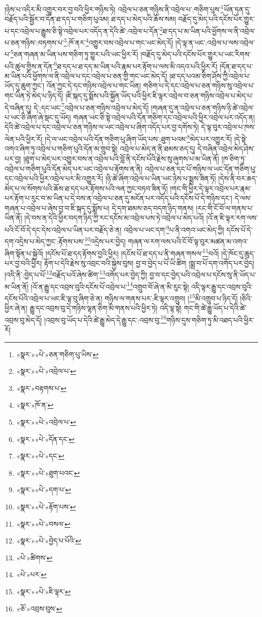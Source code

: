 །ཉེས་པ་འདིར་མི་འགྱུར་བར་བྱ་བའི་ཕྱིར་གཉིས་ཏེ། འབྲེལ་པ་ཅན་གཉིས་ནི་འབྲེལ་པ་:གཅིག་པུས་\footnote{«སྣར་»«པེ་»ཅན་གཅིག་པུ་ཡིས་}ཡོན་ཏན་དུ་བརྗོད་པའི་སྦྱོར་བ་དོན་ཐ་དད་པ་གཅིག་པུའམ། ཐ་དད་པ་མེད་པའི་ཆོས་སམ། བརྗོད་དུ་མེད་པའི་དངོས་པོར་གྱུར་པ་དང་འབྲེལ་པ་རྒྱུས་ཅི་སྟེ་འབྲེལ་པར་འདོད་ན་དེའི་ཚེ་:འབྲེལ་པ་དོན་\footnote{«སྣར་»«པེ་»འབྲེལ་པ་}ཐ་དད་པ་མ་ཡིན་པའི་ཕྱོགས་ལ་ནི་འབྲེལ་པ་ཅན་གཉིས་:བཏགས་པ་\footnote{«སྣར་»བརྟགས་པ་}:ཁོ་ནར་\footnote{«སྣར་»ཁོ་ན་}འགྱུར་བས་འབྲེལ་པ་གང་ཡང་མེད་དོ། །དེ་ལྟ་ན་ཡང་:འབྲེལ་པ་ལས་འབྲེལ་པ་\footnote{«སྣར་»«པེ་»འབྲེལ་པ་}ཅན་གཞན་མ་ཡིན་པས་གཅིག་ཏུ་གྱུར་པའི་ཡང་ཕྱིར་རོ། །བརྗོད་དུ་མེད་པའི་དངོས་པོར་གྱུར་པ་ཡང་རིགས་པའི་ཚུལ་གྱིས་ན་དོན་\footnote{«སྣར་»«པེ་»དོན་དང་}ཐ་དད་པ་ཐ་དད་མ་ཡིན་པའི་རྣམ་པར་རྟོག་པ་ལས་མི་འདའ་པའི་ཕྱིར་རོ། །དོན་ཐ་དད་པ་མ་ཡིན་པའི་ཕྱོགས་ལ་ནི་འབྲེལ་པ་དང་འབྲེལ་པ་ཅན་གྱི་གང་ཡང་མེད་དོ། །ཐ་དད་པའམ་ཅིག་ཤོས་ཀྱི་འབྲེལ་པ་ཡོད་དུ་ཆུག་ཀྱང་། འོན་ཀྱང་དེ་དང་གཉིས་འབྲེལ་པ་གང་ཡིན། གཅིག་པ་དེ་དང་འབྲེལ་པ་ཅན་གཉིས་སུ་འབྲེལ་པ་གང་ཡིན་ཏེ་མེད་པ་ཉིད་དོ། །ཇི་སྐད་དུ་སྨོས་པའི་སྐྱོན་ཡོད་པའི་ཕྱིར་ཇི་ལྟར་འབྲེལ་བ་ཅན་གཉིས་འབྲེལ་པ་མེད་པ་དེ་བཞིན་དུ། དེ་:དང་ཡང་\footnote{«སྣར་»«པེ་»དང་}འབྲེལ་པ་ཅན་གཉིས་འབྲེལ་པ་མེད་དོ། །གཞན་དུ་ན་འབྲེལ་པ་ཅན་གཉིས་ཉི་ཚེ་འབྲེལ་པ་ཡང་ཅི་ཞིག་ཞེ་སྡང་དུ་ཡོད། གཞན་ཡང་ཅི་སྟེ་འབྲེལ་པའི་དོན་གཅིག་དང་འབྲེལ་པའི་ཕྱིར་འབྲེལ་པར་འདོད་ན། དེའི་ཚེ་འབྲེལ་པ་དང་འབྲེལ་པ་ཅན་གཉིས་ལ་ཡང་འབྲེལ་པ་ཞིག་འདོད་པར་བྱ་དགོས་ཏེ། དེ་ལྟ་བུར་འབྲེལ་པ་ཁས་ལེན་པའི་ཕྱིར་རོ། །དེ་ལ་ཡང་འབྲེལ་པའི་དོན་གཅིག་པུ་ཞིག་ཡོད་པས་:ཐུག་པའམ་\footnote{«སྣར་»«པེ་»ཐུག་པའང་}མེད་པར་འགྱུར་རོ། །དེ་སྟེ་འགའ་ཞིག་ཏུ་འབྲེལ་པ་གཅིག་པུའི་དོན་མ་གྲུབ་སྟེ། འབྲེལ་པ་མེད་ན་ནི་ཐམས་ཅད་དུ། དེ་བཞིན་འབྲེལ་མེད་ཤེས་པར་བྱ། །ཐུག་པ་མེད་པར་འགྱུར་བས་ན་འབྲེལ་པའི་བློ་ནི་དངོས་པོའི་རྗེས་སུ་ཞུགས་པ་མ་ཡིན་ནོ། །ཁ་ཅིག་ཏུ་འབྲེལ་པ་གཅིག་པུའི་དོན་མེད་པར་ཡང་འབྲེལ་པ་རྟོགས་ན་ནི། འབྲེལ་པ་ཅན་དང་པོ་གཉིས་ལ་ཡང་དོན་གཅིག་པུ་དང་འབྲེལ་པའི་ཕྱིར་འབྲེལ་པར་མི་འགྱུར་རོ། །ཉི་ཚེ་ཞིག་འབྲེལ་པ་ཡིན་ཡང་ཉེས་པ་སྨྲས་ཟིན་ཏོ། །དེས་ནི་བར་ཆད་མེད་པ་ལ་སོགས་པའི་ཆོས་ཐ་དད་པར་རྟོགས་པའི་ལན་ཀྱང་བཏབ་ཟིན་ཏོ། །གང་གི་ཕྱིར་དེ་ལྟར་འབྲེལ་པར་རྣམ་པར་རྟོག་པ་རུང་བ་མ་ཡིན་པ་དེ་བས་ན་འབྲེལ་པ་ཅན་དུ་མངོན་པར་འདོད་པའི་དངོས་པོ་དེ་གཉིས་དང་། དེ་ལས་གཞན་པ་འབྲེལ་པ་ཞེས་བྱ་བ་ཇི་སྐད་དུ་སྨོས་པ། དེ་དག་ཐམས་ཅད་བདག་ཉིད་གནས། །རང་གི་ངོ་བོ་ལ་གནས་པ་ཡིན་ནོ། །དེ་བས་ན་དེའི་ཕྱིར་བདག་ཉིད་ཀྱི་རང་དངོས་མ་འབྲེལ་པས་ཏེ་འབྲེལ་པ་མེད་པའོ། །འོ་ན་ཇི་ལྟར་རག་ལས་པའི་ངོ་བོ་དེ་དང་དེས་འབྲེལ་པ་ཡིན་པར་བརྗོད་ཅེ་ན། འབྲེལ་པ་ཡང་དག་\footnote{«སྣར་»«པེ་»དག་པ་}པ་ནི་འགའ་ཡང་མེད་ཀྱི། དངོས་པོ་དེ་དག་འདྲེས་པ་མེད་ཀྱང་:རྟོགས་པས་\footnote{«སྣར་»«པེ་»རྟོག་པས་}འདྲེས་པར་བྱེད། གཞན་ལ་རག་ལས་པའི་ངོ་བོ་ལྟ་བུར་མཚན་མ་འགའ་ཞིག་སྟོན་པ་སྐྱེའོ། །དངོས་པོ་ཐ་དད་རྟོགས་བྱའི་ཕྱིར། །དངོས་པོ་ཐ་དད་པ་ནི་གཞན་གསལ་\footnote{«སྣར་»«པེ་»བསལ་}བའོ། །དེ་ཁོང་དུ་ཆུད་པར་བྱ་བའི་ཕྱིར། རྟོག་པ་དེའི་རྗེས་སུ་འབྲང་བའི་སྐྱེས་བུས། བྱ་བ་བྱེད་པ་པོ་ཡི་ཚིག །སྨྲ་བ་པོ་དག་འགོད་པར་བྱེད། །འདི་ནི་:བྱེད་པ་པོ་\footnote{«སྣར་»«པེ་»བྱེད་པ་པོའི་}བརྗོད་པའོ་ཞེས་ཚིག་\footnote{«པེ་»ཚིགས་}འགོད་པར་བྱེད་ཀྱི། བྱ་བ་དང་བྱེད་པའི་འབྲེལ་པ་དངོས་སུ་ནི་ཡོད་པ་མ་ཡིན་ནོ། །འོ་ན་རྒྱུ་དང་འབྲས་བུའི་དངོས་པོ་འབྲེལ་པ་\footnote{«པེ་»པར་}འགྲུབ་བོ་ཞེ་ན་མི་རུང་སྟེ། འདི་ལྟར་རྒྱུ་དང་འབྲས་བུའི་དངོས་པོའི་འབྲེལ་པ་ཡང་ཇི་ལྟ་བུ་ཞིག་ཅེ་ན། གཉིས་ལ་གནས་པར་:ཇི་ལྟར་འགྲུབ། །\footnote{«སྣར་»«པེ་»ཇི་ལྟར་}མི་འགྲུབ་པ་ཉིད་དོ། །ཅིའི་ཕྱིར་ཞེ་ན། རྒྱུ་དང་འབྲས་བུ་དེ་གཉིས་ལྷན་ཅིག་མི་གནས་པའི་ཕྱིར་ཏེ། འདི་ལྟ་སྟེ། གང་གི་ཚེ་རྒྱུ་ཡོད་པ་དེའི་ཚེ་འབྲས་བུ་མེད་དོ། །འབྲས་བུ་ཡོད་པ་དེའི་ཚེ་རྒྱུ་མེད་དེ་རྒྱུ་དང་:འབྲས་བུ་\footnote{«ཅོ་»འབྲས་བུས་}གཉིས་དུས་གཅིག་ཏུ་མི་འཐད་པའི་ཕྱིར་རོ། 